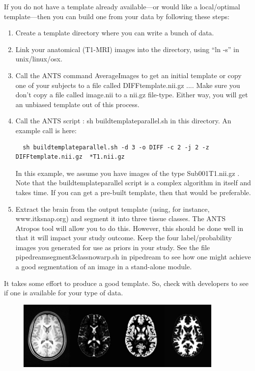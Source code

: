 \documentclass{InsightArticle}
\begin{document}
If you do not have a template already available---or would like a local/optimal 
template---then you can build one from your data by following these steps:
\begin{enumerate}
\item Create a template directory where you can write a bunch of data.
\item Link your anatomical (T1-MRI) images into the directory, using ``ln -s'' in unix/linux/osx.
\item Call the ANTS command AverageImages to get an initial template
  or copy one of your subjects to a file called DIFFtemplate.nii.gz
  .... Make sure you don't copy a file called image.nii to a nii.gz
  file-type.  Either way, you will get an unbiased template out of this process.  
\item Call the ANTS script :   sh buildtemplateparallel.sh in this directory.  
  An example call is here: 
\begin{verbatim}
  sh buildtemplateparallel.sh -d 3 -o DIFF -c 2 -j 2 -z DIFFtemplate.nii.gz  *T1.nii.gz 
\end{verbatim}
  In this example, we assume you have images of the type   Sub001T1.nii.gz .
  Note that the buildtemplateparallel script is a complex algorithm in itself and takes time.  
  If you can get a pre-built template, then that would be preferable. 
\item  Extract the brain from the output template (using, for instance, www.itksnap.org) and segment it into three tissue classes.  
  The ANTS Atropos tool will allow you to do this.  However, this should be done well in that 
  it will impact your study outcome.   Keep the four label/probability images you generated for use as priors in your study. 
  See the file pipedreamsegment3classnowarp.sh in pipedream to see how one might achieve a good segmentation of an image 
  in a stand-alone module.  
\end{enumerate}
It takes some effort to produce a good template.  So, check with developers to see 
if one is available for your type of data.

\begin{figure}
\includegraphics[width=0.9\textwidth]{figures/templatefig.jpg} 
\vspace{-0.1in}
\label{fig:template}
\end{figure}
\end{document}
